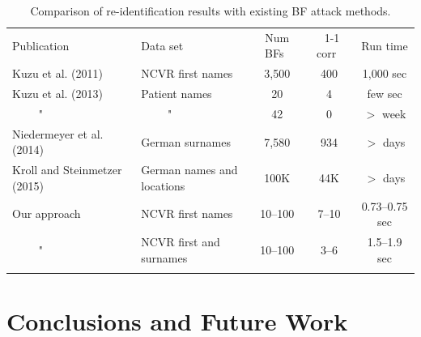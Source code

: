 \documentclass{llncs}
\begin{document}
\begin{table}[!t]
  \caption{Comparison of re-identification results with existing BF
     attack methods.}
     \label{table:exist_approaches}
  \centering
  \begin{scriptsize}
    \begin{tabular}{llccc}
    \hline\noalign{\smallskip}
   Publication & Data set & Num BFs~ & ~1-1 corr~ & Run time
     \\ \noalign{\smallskip}\hline\noalign{\smallskip}
  Kuzu et al. (2011)~\cite{Kuz11} & NCVR first names & 3,500 & 400 &
    1,000 sec \\
  Kuzu et al. (2013)~\cite{Kuz13} & Patient names & 20 & 4 & 
    few sec \\
  ~~~~ " & ~~~~ " & 42 & 0 & $>$ week \\
  Niedermeyer et al. (2014)~\cite{Nie14}~ & German surnames & 7,580 &
    934 & $>$ days  \\
  Kroll and Steinmetzer (2015)~\cite{Kro15}~ & German names and
    locations & 100K & 44K & $>$ days \\
  Our approach & NCVR first names & 10--100 & 7--10 & 0.73--0.75 sec
    \\
  ~~~~ " & NCVR first and surnames & 10--100 & 3--6 & 1.5--1.9
  sec  \\
  \noalign{\smallskip} \hline
  \end{tabular}
  \end{scriptsize}
\end{table}


\section{Conclusions and Future Work}
\label{sec-concl}


%

 
\end{document}
